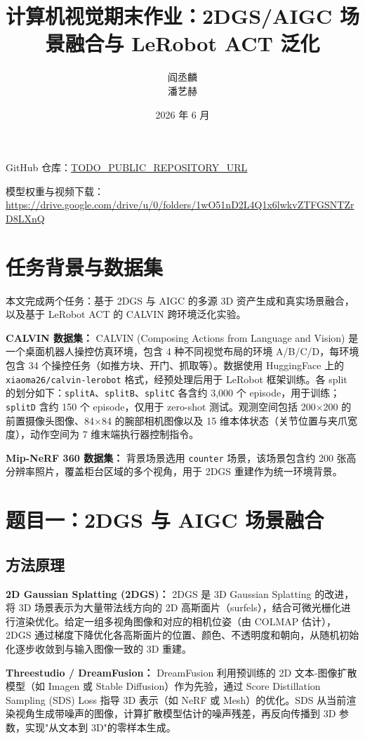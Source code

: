 \documentclass[12pt,a4paper,fontset=fandol]{ctexart}
\title{计算机视觉期末作业：2DGS/AIGC 场景融合与 LeRobot ACT 泛化}
\author{阎丞麟 \quad 23307110060 \\
 潘艺赫\quad 23307110090}
\date{2026 年 6 月}
\begin{document}
\maketitle

\noindent GitHub 仓库：\url{TODO_PUBLIC_REPOSITORY_URL}

\noindent 模型权重与视频下载：\url{https://drive.google.com/drive/u/0/folders/1wO51nD2L4Q1x6lwkvZTFGSNTZrD8LXnQ}
\section{任务背景与数据集}
本文完成两个任务：基于 2DGS 与 AIGC 的多源 3D 资产生成和真实场景融合，以及基于 LeRobot ACT 的 CALVIN 跨环境泛化实验。

\textbf{CALVIN 数据集：} CALVIN (Composing Actions from Language and Vision) 是一个桌面机器人操控仿真环境，包含 4 种不同视觉布局的环境 A/B/C/D，每环境包含 34 个操控任务（如推方块、开门、抓取等）。数据使用 HuggingFace 上的 \texttt{xiaoma26/calvin-lerobot} 格式，经预处理后用于 LeRobot 框架训练。各 split 的划分如下：\texttt{splitA}、\texttt{splitB}、\texttt{splitC} 各含约 3,000 个 episode，用于训练；\texttt{splitD} 含约 150 个 episode，仅用于 zero-shot 测试。观测空间包括 200×200 的前置摄像头图像、84×84 的腕部相机图像以及 15 维本体状态（关节位置与夹爪宽度），动作空间为 7 维末端执行器控制指令。

\textbf{Mip-NeRF 360 数据集：} 背景场景选用 \texttt{counter} 场景，该场景包含约 200 张高分辨率照片，覆盖柜台区域的多个视角，用于 2DGS 重建作为统一环境背景。

\section{题目一：2DGS 与 AIGC 场景融合}
\subsection{方法原理}

\textbf{2D Gaussian Splatting (2DGS)：} 2DGS 是 3D Gaussian Splatting 的改进，将 3D 场景表示为大量带法线方向的 2D 高斯面片（surfels），结合可微光栅化进行渲染优化。给定一组多视角图像和对应的相机位姿（由 COLMAP 估计），2DGS 通过梯度下降优化各高斯面片的位置、颜色、不透明度和朝向，从随机初始化逐步收敛到与输入图像一致的 3D 重建。

\textbf{Threestudio / DreamFusion：} DreamFusion 利用预训练的 2D 文本-图像扩散模型（如 Imagen 或 Stable Diffusion）作为先验，通过 Score Distillation Sampling (SDS) Loss 指导 3D 表示（如 NeRF 或 Mesh）的优化。SDS 从当前渲染视角生成带噪声的图像，计算扩散模型估计的噪声残差，再反向传播到 3D 参数，实现"从文本到 3D"的零样本生成。
\end{document}
